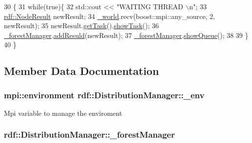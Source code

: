 \begin{DoxyCode}
30                                             \{
31     \textcolor{keywordflow}{while}(\textcolor{keyword}{true})\{
32         std::cout << \textcolor{stringliteral}{"WAITING THREAD \(\backslash\)n"};
33         \hyperlink{classrdf_1_1NodeResult}{rdf::NodeResult} newResult;
34         \hyperlink{classrdf_1_1DistributionManager_ac8a061176717baf96b2913cd22dcbf20}{\_world}.recv(boost::mpi::any\_source, 2, newResult); 
35         newResult.\hyperlink{classrdf_1_1NodeResult_a564d581492a48333ed9796f6fd4b8c6a}{getTask}().\hyperlink{classrdf_1_1Task_aed5f96455f9684078a5fa8fce849d197}{showTask}();
36         \hyperlink{classrdf_1_1DistributionManager_aba2daa8780c7915f9f1a5d871edb93c9}{\_forestManager}.\hyperlink{classrdf_1_1ForestManager_a1399d029371b213523492ea8397199b6}{addResuld}(newResult);            
37         \hyperlink{classrdf_1_1DistributionManager_aba2daa8780c7915f9f1a5d871edb93c9}{\_forestManager}.\hyperlink{classrdf_1_1ForestManager_af8975e5a2ea89cf3477241ebf7915ebe}{showQueue}();
38         
39     \}
40 \}
\end{DoxyCode}


\subsection{Member Data Documentation}
\subsubsection[{\texorpdfstring{\+\_\+env}{_env}}]{\setlength{\rightskip}{0pt plus 5cm}mpi\+::environment rdf\+::\+Distribution\+Manager\+::\+\_\+env\hspace{0.3cm}{\ttfamily [private]}}\hypertarget{classrdf_1_1DistributionManager_ab24e19df5707be063ee48ef9f41af13f}{}\label{classrdf_1_1DistributionManager_ab24e19df5707be063ee48ef9f41af13f}
Mpi variable to manage the enviroment 
\subsubsection[{\texorpdfstring{\+\_\+forest\+Manager}{_forestManager}}]{ rdf\+::\+Distribution\+Manager\+::\+\_\+forest\+Manager\hspace{0.3cm}{\ttfamily [private]}}\hypertarget{classrdf_1_1DistributionManager_aba2daa8780c7915f9f1a5d871edb93c9}{}\label{classrdf_1_1DistributionManager_aba2daa8780c7915f9f1a5d871edb93c9}


